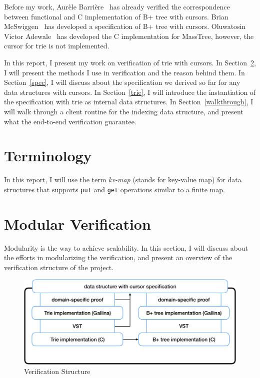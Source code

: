 \documentclass[runningheads]{llncs}
\begin{document}
Before my work, Aur\`ele Barri\`ere~\cite{aurele} has already verified the
correspondence between functional and C implementation of B+ tree with cursors.
Brian McSwiggen~\cite{brian} has developed a specification of B+ tree with
cursors. Oluwatosin Victor Adewale~\cite{oluwatosin} has developed the C
implementation for MassTree, however, the cursor for trie is not implemented.

In this report, I present my work on verification of trie with cursors. In
Section~\ref{modver}, I will present the methods I use in verification and the
reason behind them. In Section~\ref{spec}, I will discuss about the
specification we derived so far for any data structures with cursors. In
Section~\ref{trie}, I will introduce the instantiation of the specification with
trie as internal data structures. In Section~\ref{walkthrough}, I will walk
through a client routine for the indexing data structure, and present what the
end-to-end verification guarantee. 

\section{Terminology}

In this report, I will use the term \emph{kv-map} (stands for key-value map) for
data structures that supports \texttt{put} and \texttt{get} operations similar
to a finite map. 


\section{Modular Verification}\label{modver}

Modularity is the way to achieve scalability. In this section, I will discuss
about the efforts in modularizing the verification, and present an overview
of the verification structure of the project.

\begin{figure}[htbp]
  \centering
  \includegraphics[width=\textwidth]{diagram.png}
  \caption{Verification Structure}\label{fig:struct}
\end{figure}
\end{document}
